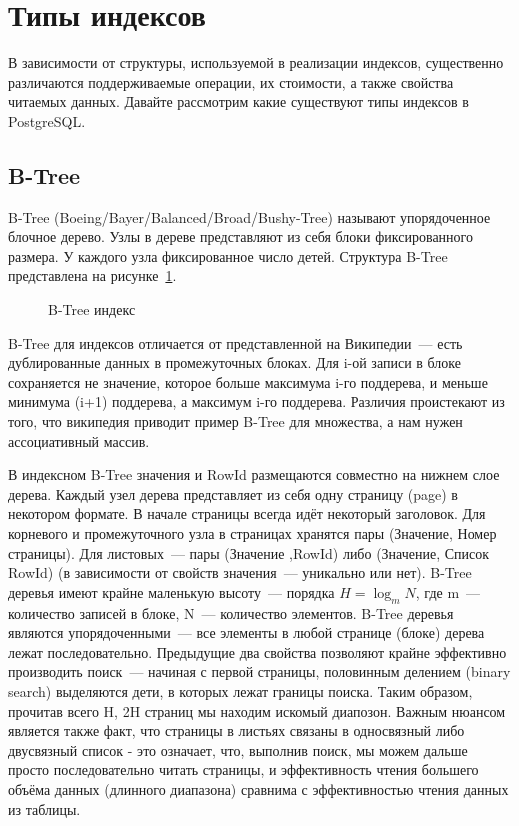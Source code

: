 \section{Типы индексов}

В зависимости от структуры, используемой в реализации индексов, существенно различаются поддерживаемые операции, их стоимости, а также свойства читаемых данных. Давайте рассмотрим какие существуют типы индексов в PostgreSQL.


\subsection{B-Tree}

B-Tree (Boeing/Bayer/Balanced/Broad/Bushy-Tree) называют упорядоченное блочное дерево. Узлы в дереве представляют из себя блоки фиксированного размера. У каждого узла фиксированное число детей. Структура B-Tree представлена на рисунке~\ref{fig:btree_index}.

\begin{figure}[ht!]
  \caption{B-Tree индекс}
  \label{fig:btree_index}
\end{figure}

B-Tree для индексов отличается от представленной на Википедии~--- есть дублированные данных в промежуточных блоках. Для i-ой записи в блоке сохраняется не значение, которое больше максимума i-го поддерева, и меньше минимума (i+1) поддерева, а максимум i-го поддерева. Различия проистекают из того, что википедия приводит пример B-Tree для множества, а нам нужен ассоциативный массив.

В индексном B-Tree значения и RowId размещаются совместно на нижнем слое дерева. Каждый узел дерева представляет из себя одну страницу (page) в некотором формате. В начале страницы всегда идёт некоторый заголовок. Для корневого и промежуточного узла в страницах хранятся пары (Значение, Номер страницы). Для листовых~--- пары (Значение ,RowId) либо (Значение, Список RowId) (в зависимости от свойств значения~--- уникально или нет). B-Tree деревья имеют крайне маленькую высоту~--- порядка $H = \log_m{N}$, где m~--- количество записей в блоке, N~--- количество элементов. B-Tree деревья являются упорядоченными~--- все элементы в любой странице (блоке) дерева лежат последовательно. Предыдущие два свойства позволяют крайне эффективно производить поиск~--- начиная с первой страницы, половинным делением (binary search) выделяются дети, в которых лежат границы поиска. Таким образом, прочитав всего H, 2H страниц мы находим искомый диапозон. Важным нюансом является также факт, что страницы в листьях связаны в односвязный либо двусвязный список - это означает, что, выполнив поиск, мы можем дальше просто последовательно читать страницы, и эффективность чтения большего объёма данных (длинного диапазона) сравнима с эффективностью чтения данных из таблицы.

